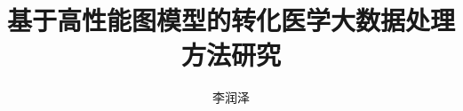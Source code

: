 \documentclass[doctor,twoside,nocpsupervisor]{zjuthesis}
\title{基于高性能图模型的转化医学大数据处理方法研究}
\author{李润泽}
\institute{生物医学工程与仪器科学学院}
\begin{document}
\ZJUmakecover
\frontmatter
% 

% 
\tableofcontents
% 
\mainmatter



% 
% 
% 
\backmatter

\appendix
% 
% 
\end{document}
